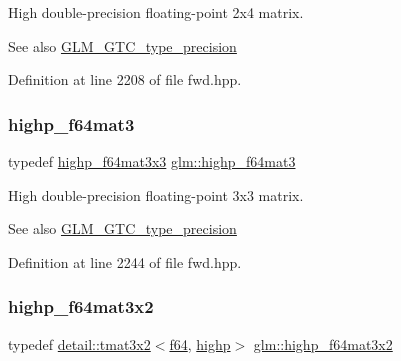 High double-\/precision floating-\/point 2x4 matrix. \begin{DoxySeeAlso}{See also}
\hyperlink{group__gtc__type__precision}{G\+L\+M\+\_\+\+G\+T\+C\+\_\+type\+\_\+precision} 
\end{DoxySeeAlso}


Definition at line 2208 of file fwd.\+hpp.

\mbox{\label{group__gtc__type__precision_ga00c5743b0eba6b437422571f4eda27b8}} 
\subsubsection{\texorpdfstring{highp\+\_\+f64mat3}{highp\_f64mat3}}
{\footnotesize\ttfamily typedef \hyperlink{group__gtc__type__precision_gaf520a9307867c632408029a53af3e375}{highp\+\_\+f64mat3x3} \hyperlink{group__gtc__type__precision_ga00c5743b0eba6b437422571f4eda27b8}{glm\+::highp\+\_\+f64mat3}}

High double-\/precision floating-\/point 3x3 matrix. \begin{DoxySeeAlso}{See also}
\hyperlink{group__gtc__type__precision}{G\+L\+M\+\_\+\+G\+T\+C\+\_\+type\+\_\+precision} 
\end{DoxySeeAlso}


Definition at line 2244 of file fwd.\+hpp.

\mbox{\label{group__gtc__type__precision_ga5cdc9d6fb9ce07e5485c4e2db919ce7e}} 
\subsubsection{\texorpdfstring{highp\+\_\+f64mat3x2}{highp\_f64mat3x2}}
{\footnotesize\ttfamily typedef \hyperlink{structglm_1_1detail_1_1tmat3x2}{detail\+::tmat3x2}$<$\hyperlink{group__gtc__type__precision_ga2bba392e555124b36cde6abba349bab3}{f64}, \hyperlink{namespaceglm_a0f04f086094c747d227af4425893f545ac6f7eab42eacbb10d59a58e95e362074}{highp}$>$ \hyperlink{group__gtc__type__precision_ga5cdc9d6fb9ce07e5485c4e2db919ce7e}{glm\+::highp\+\_\+f64mat3x2}}

